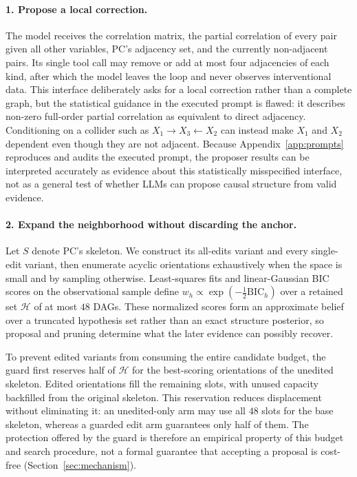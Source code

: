 \documentclass{article}
\newcommand{\Hyp}{\mathcal{H}}
\begin{document}
\paragraph{1. Propose a local correction.}
The model receives the correlation matrix, the partial correlation of every pair given all other
variables, PC's adjacency set, and the currently non-adjacent pairs. Its single tool call may remove
or add at most four adjacencies of each kind, after which the model leaves the loop and never observes
interventional data. This interface deliberately asks for a local correction rather than a complete
graph, but the statistical guidance in the executed prompt is flawed: it describes non-zero
full-order partial correlation as equivalent to direct adjacency. Conditioning on a collider such as
$X_1 \to X_3 \leftarrow X_2$ can instead make $X_1$ and $X_2$ dependent even though they are not
adjacent. Because Appendix~\ref{app:prompts} reproduces and audits the executed prompt, the proposer
results can be interpreted accurately as evidence about this statistically misspecified
interface, not as a general test of whether LLMs can propose causal structure from valid evidence.

\paragraph{2. Expand the neighborhood without discarding the anchor.}
Let $S$ denote PC's skeleton. We construct its all-edits variant and every single-edit variant, then
enumerate acyclic orientations exhaustively when the space is small and by sampling otherwise.
Least-squares fits and linear-Gaussian BIC scores on the observational sample define
$w_h \propto \exp(-\tfrac12\mathrm{BIC}_h)$ over a retained set $\Hyp$ of at most $48$ DAGs. These
normalized scores form an approximate belief over a truncated hypothesis set rather than an exact
structure posterior, so proposal and pruning determine what the later evidence can possibly recover.

To prevent edited variants from consuming the entire candidate budget, the guard first reserves
half of $\Hyp$ for the best-scoring orientations of the unedited skeleton. Edited orientations fill
the remaining slots, with unused capacity backfilled from the original skeleton. This reservation
reduces displacement without eliminating it: an unedited-only arm may use all $48$ slots for the
base skeleton, whereas a guarded edit arm guarantees only half of them. The protection offered by
the guard is therefore an empirical property of this budget and search procedure, not a formal
guarantee that accepting a proposal is cost-free (Section~\ref{sec:mechanism}).
\end{document}
